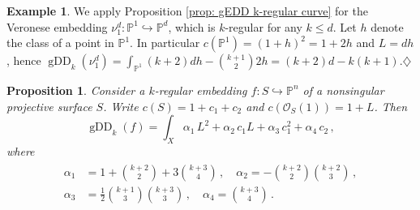 \documentclass[11pt,reqno]{amsart}
\numberwithin{equation}{section}
\theoremstyle{plain}
\numberwithin{theorem}{section}
\newtheorem{proposition}[theorem]{Proposition}
\theoremstyle{definition}
\newtheorem{example}[theorem]{Example}
\renewcommand{\P}{\mathbb{P}}
\newcommand{\OO}{\mathcal{O}}
\newcommand{\gDD}{\operatorname{gDD}}
\begin{document}
\begin{example}\label{ex: gDD Veronese embedding projective line}
We apply Proposition \ref{prop: gEDD k-regular curve} for the Veronese embedding $\nu_1^d\colon\P^1\hookrightarrow\P^d$, which is $k$-regular for any $k\le d$. Let $h$ denote the class of a point in $\P^1$. In particular $c(\P^1)=(1+h)^2=1+2h$ and $L=dh$, hence $\gDD_k(\nu_1^d) = \int_{\P^1}(k+2)dh-\binom{k+1}{2}2h = (k+2)d-k(k+1)$.\hfill$\diamondsuit$
\end{example}

\begin{proposition}\label{prop: gEDD k-regular surface}
Consider a $k$-regular embedding $f\colon S\hookrightarrow\P^n$ of a nonsingular projective surface $S$. Write $c(S)=1+c_1+c_2$ and $c(\OO_S(1))=1+L$. Then
\begin{equation}\label{eq: gEDD k-regular surface}
\gDD_k(f) = \int_X\alpha_1\,L^2+\alpha_2\,c_1L+\alpha_3\,c_1^2+\alpha_4\,c_2\,,
\end{equation}
where
\begin{align}\label{eq: coefficients alpha}
\begin{split}
    \alpha_1 &= 1+\binom{k+2}{2}+3\binom{k+3}{4}\,,\quad\alpha_2 = -\binom{k+2}{2}\binom{k+2}{3}\,,\\
    \alpha_3 &= \frac{1}{2}\binom{k+1}{3}\binom{k+3}{3}\,,\quad\alpha_4 = \binom{k+3}{4}\,.
\end{split}
\end{align}
\end{proposition}
\end{document}
